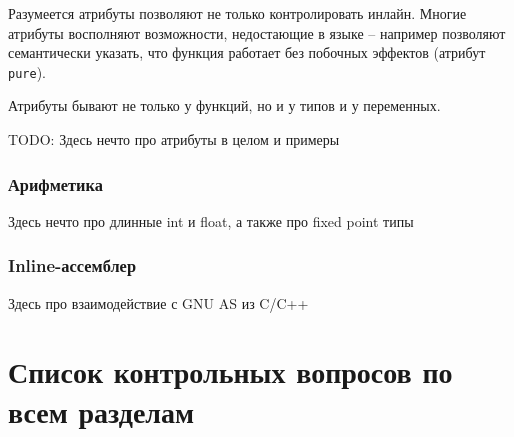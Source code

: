 \documentclass[a4paper,12pt,oneside]{article}
\begin{document}
Разумеется атрибуты позволяют не только контролировать инлайн. Многие атрибуты восполняют возможности, недостающие в языке -- например позволяют семантически указать, что функция работает без побочных эффектов (атрибут \lstinline!pure!).

Атрибуты бывают не только у функций, но и у типов и у переменных.

TODO: Здесь нечто про атрибуты в целом и примеры 

\subsubsection{Арифметика}

Здесь нечто про длинные int и float, а также про fixed point типы

\subsubsection{Inline-ассемблер}

Здесь про взаимодействие с GNU AS из C/C++


\pagebreak
\section*{Список контрольных вопросов по всем разделам}
\end{document}
